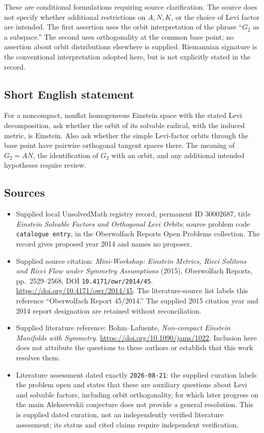 \documentclass[11pt]{article}
\begin{document}
These are conditional formulations requiring source clarification. The source does not specify whether additional restrictions on \(A,N,K\), or the choice of Levi factor are intended. The first assertion uses the orbit interpretation of the phrase ``\(G_2\) as a subspace.'' The second uses orthogonality at the common base point; no assertion about orbit distributions elsewhere is supplied. Riemannian signature is the conventional interpretation adopted here, but is not explicitly stated in the record.
\subsection{Short English statement}
For a noncompact, nonflat homogeneous Einstein space with the stated Levi decomposition, ask whether the orbit of its solvable radical, with the induced metric, is Einstein. Also ask whether the simple Levi-factor orbits through the base point have pairwise orthogonal tangent spaces there. The meaning of \(G_2=AN\), the identification of \(G_2\) with an orbit, and any additional intended hypotheses require review.
\subsection{Sources}
\begin{itemize}
\item Supplied local UnsolvedMath registry record, permanent ID \(30002687\), title \emph{Einstein Solvable Factors and Orthogonal Levi Orbits}; source problem code \texttt{catalogue entry}, in the Oberwolfach Reports Open Problems collection. The record gives proposed year 2014 and names no proposer.
\item Supplied source citation: \emph{Mini-Workshop: Einstein Metrics, Ricci Solitons and Ricci Flow under Symmetry Assumptions} (2015), Oberwolfach Reports, pp.\ 2529--2568, DOI \texttt{10.4171/owr/2014/45}. \url{https://doi.org/10.4171/owr/2014/45}. The literature-source list labels this reference ``Oberwolfach Report 45/2014.'' The supplied 2015 citation year and 2014 report designation are retained without reconciliation.
\item Supplied literature reference: Bohm--Lafuente, \emph{Non-compact Einstein Manifolds with Symmetry}. \url{https://doi.org/10.1090/jams/1022}. Inclusion here does not attribute the questions to these authors or establish that this work resolves them.
\item Literature assessment dated exactly \texttt{2026-08-21}: the supplied curation labels the problem open and states that these are auxiliary questions about Levi and solvable factors, including orbit orthogonality, for which later progress on the main Alekseevskii conjecture does not provide a general resolution. This is supplied dated curation, not an independently verified literature assessment; its status and cited claims require independent verification.
\end{itemize}
\end{document}
